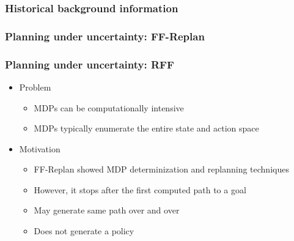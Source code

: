 \documentclass{beamer}
\let\origframetitle=\frametitle
\renewcommand\frametitle[1]{\origframetitle{\textbf{\large{\textrm{#1}}}}}
\begin{document}
\begin{frame}
  \frametitle{Historical background information}


\end{frame}

\begin{frame}
  \frametitle{Planning under uncertainty: FF-Replan}
\end{frame}

\begin{frame}
  \frametitle{Planning under uncertainty: RFF}

  \begin{itemize}
    \item Problem
      \begin{itemize}
        \item MDPs can be computationally intensive
        \item MDPs typically enumerate the entire state and action space
      \end{itemize}
    \item Motivation
      \begin{itemize}
        \item FF-Replan showed MDP determinization and replanning techniques
        \item However, it stops after the first computed path to a goal
        \item May generate same path over and over
        \item Does not generate a policy
      \end{itemize}
  \end{itemize}

\end{frame}
\end{document}
